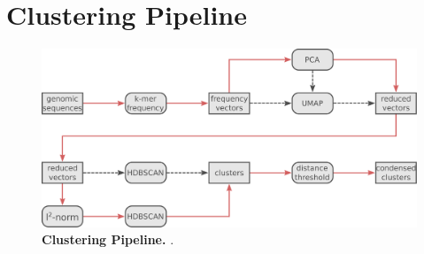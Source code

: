 \section{Clustering Pipeline} \label{sec:Clustering_Pipeline}

\blindtext

\begin{figure}[!hbt]
    \includegraphics[width=\dimexpr\textwidth-2\fboxsep-2\fboxrule,fbox]{Extra_Graphics/Pipeline_V2.pdf}
    \caption[Clustering Pipeline]{\textbf{Clustering Pipeline.} .}
    \label{fig:Clustering_Pipeline}
\end{figure}
